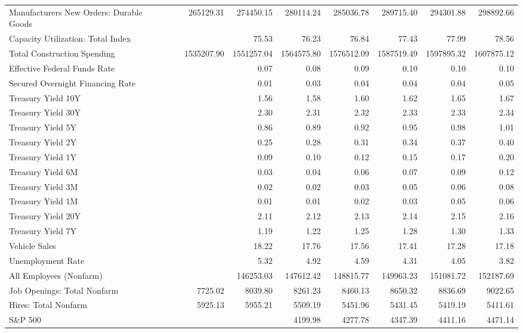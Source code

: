 \documentclass[11pt, letterpaper]{article}\usepackage[]{graphicx}\usepackage[]{color}
\begin{document}
\begin{table}[H]
\begin{tabular}{lrrrrrrrr}
  Manufacturers New Orders: Durable Goods &  & 265129.31 & 274450.15 & 280114.24 & 285036.78 & 289715.40 & 294301.88 & 298892.66 \\ 
  Capacity Utilization: Total Index &  &  & 75.53 & 76.23 & 76.84 & 77.43 & 77.99 & 78.56 \\ 
  Total Construction Spending &  & 1535207.90 & 1551257.04 & 1564575.80 & 1576512.09 & 1587519.49 & 1597895.32 & 1607875.12 \\ 
  Effective Federal Funds Rate &  &  & 0.07 & 0.08 & 0.09 & 0.10 & 0.10 & 0.10 \\ 
  Secured Overnight Financing Rate &  &  & 0.01 & 0.03 & 0.04 & 0.04 & 0.04 & 0.05 \\ 
  Treasury Yield 10Y &  &  & 1.56 & 1.58 & 1.60 & 1.62 & 1.65 & 1.67 \\ 
  Treasury Yield 30Y &  &  & 2.30 & 2.31 & 2.32 & 2.33 & 2.33 & 2.34 \\ 
  Treasury Yield 5Y &  &  & 0.86 & 0.89 & 0.92 & 0.95 & 0.98 & 1.01 \\ 
  Treasury Yield 2Y &  &  & 0.25 & 0.28 & 0.31 & 0.34 & 0.37 & 0.40 \\ 
  Treasury Yield 1Y &  &  & 0.09 & 0.10 & 0.12 & 0.15 & 0.17 & 0.20 \\ 
  Treasury Yield 6M &  &  & 0.03 & 0.04 & 0.06 & 0.07 & 0.09 & 0.12 \\ 
  Treasury Yield 3M &  &  & 0.02 & 0.02 & 0.03 & 0.05 & 0.06 & 0.08 \\ 
  Treasury Yield 1M &  &  & 0.01 & 0.01 & 0.02 & 0.03 & 0.05 & 0.06 \\ 
  Treasury Yield 20Y &  &  & 2.11 & 2.12 & 2.13 & 2.14 & 2.15 & 2.16 \\ 
  Treasury Yield 7Y &  &  & 1.19 & 1.22 & 1.25 & 1.28 & 1.30 & 1.33 \\ 
  Vehicle Sales &  &  & 18.22 & 17.76 & 17.56 & 17.41 & 17.28 & 17.18 \\ 
  Unemployment Rate &  &  & 5.32 & 4.92 & 4.59 & 4.31 & 4.05 & 3.82 \\ 
  All Employees (Nonfarm) &  &  & 146253.03 & 147612.42 & 148815.77 & 149963.23 & 151081.72 & 152187.69 \\ 
  Job Openings: Total Nonfarm &  & 7725.02 & 8039.80 & 8261.23 & 8460.13 & 8650.32 & 8836.69 & 9022.65 \\ 
  Hires: Total Nonfarm &  & 5925.13 & 5955.21 & 5509.19 & 5451.96 & 5431.45 & 5419.19 & 5411.61 \\ 
  S\&P 500 &  &  &  & 4199.98 & 4277.78 & 4347.39 & 4411.16 & 4471.14 \\ 

\end{tabular}
\end{table}
\end{document}

